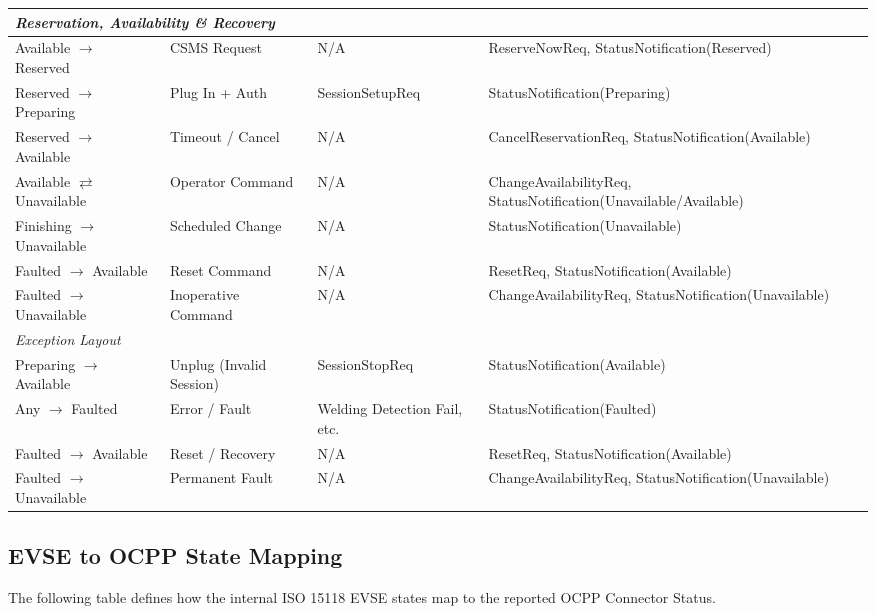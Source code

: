 \documentclass[a4paper,11pt]{report}
\begin{document}
\begin{longtable}{|p{3.0cm}|p{3.5cm}|p{4.5cm}|p{4.5cm}|}
\hline
\multicolumn{4}{|l|}{\textit{Reservation, Availability \& Recovery}} \\
\hline
Available $\rightarrow$ Reserved & CSMS Request & N/A & ReserveNowReq, StatusNotification(Reserved) \\
\hline
Reserved $\rightarrow$ Preparing & Plug In + Auth & SessionSetupReq & StatusNotification(Preparing) \\
\hline
Reserved $\rightarrow$ Available & Timeout / Cancel & N/A & CancelReservationReq, StatusNotification(Available) \\
\hline
Available $\rightleftarrows$ Unavailable & Operator Command & N/A & ChangeAvailabilityReq, StatusNotification(Unavailable/Available) \\
\hline
Finishing $\rightarrow$ Unavailable & Scheduled Change & N/A & StatusNotification(Unavailable) \\
\hline
Faulted $\rightarrow$ Available & Reset Command & N/A & ResetReq, StatusNotification(Available) \\
\hline
Faulted $\rightarrow$ Unavailable & Inoperative Command & N/A & ChangeAvailabilityReq, StatusNotification(Unavailable) \\
\hline
\multicolumn{4}{|l|}{\textit{Exception Layout}} \\
\hline
Preparing $\rightarrow$ Available & Unplug (Invalid Session) & SessionStopReq & StatusNotification(Available) \\
\hline
Any $\rightarrow$ Faulted & Error / Fault & Welding Detection Fail, etc. & StatusNotification(Faulted) \\
\hline
Faulted $\rightarrow$ Available & Reset / Recovery & N/A & ResetReq, StatusNotification(Available) \\
\hline
Faulted $\rightarrow$ Unavailable & Permanent Fault & N/A & ChangeAvailabilityReq, StatusNotification(Unavailable) \\
\hline
\end{longtable}


\subsection{EVSE to OCPP State Mapping}
The following table defines how the internal ISO 15118 EVSE states map to the reported OCPP Connector Status.
\end{document}
